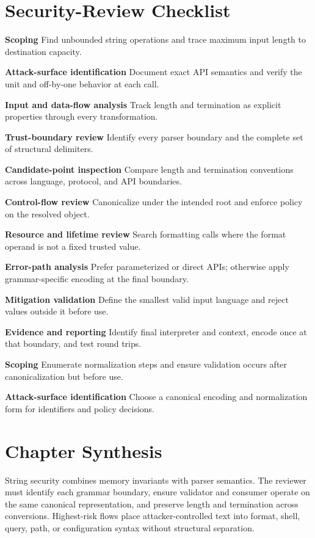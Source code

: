 \documentclass[11pt,letterpaper]{article}
\begin{document}
\section{Security-Review Checklist}
\begin{CornellChecklist}
\item \textbf{Scoping}
Find unbounded string operations and trace maximum input length to destination capacity.
\item \textbf{Attack-surface identification}
Document exact API semantics and verify the unit and off-by-one behavior at each call.
\item \textbf{Input and data-flow analysis}
Track length and termination as explicit properties through every transformation.
\item \textbf{Trust-boundary review}
Identify every parser boundary and the complete set of structural delimiters.
\item \textbf{Candidate-point inspection}
Compare length and termination conventions across language, protocol, and API boundaries.
\item \textbf{Control-flow review}
Canonicalize under the intended root and enforce policy on the resolved object.
\item \textbf{Resource and lifetime review}
Search formatting calls where the format operand is not a fixed trusted value.
\item \textbf{Error-path analysis}
Prefer parameterized or direct APIs; otherwise apply grammar-specific encoding at the final boundary.
\item \textbf{Mitigation validation}
Define the smallest valid input language and reject values outside it before use.
\item \textbf{Evidence and reporting}
Identify final interpreter and context, encode once at that boundary, and test round trips.
\item \textbf{Scoping}
Enumerate normalization steps and ensure validation occurs after canonicalization but before use.
\item \textbf{Attack-surface identification}
Choose a canonical encoding and normalization form for identifiers and policy decisions.
\end{CornellChecklist}
\section{Chapter Synthesis}
String security combines memory invariants with parser semantics. The reviewer must identify each grammar boundary, ensure validator and consumer operate on the same canonical representation, and preserve length and termination across conversions. Highest-risk flows place attacker-controlled text into format, shell, query, path, or configuration syntax without structural separation.
\end{document}
